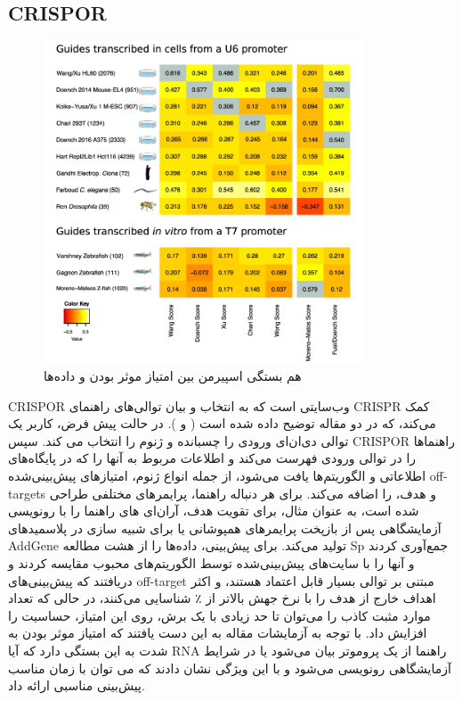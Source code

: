 \documentclass[12pt,a4paper,BCOR=.7cm,headsepline,bibliography=totoc]{report}
\begin{document}
\subsection{CRISPOR~\cite{CRISPOR}}
\begin{figure}
\centering
\includegraphics[width=9.5cm, ]{pictures/CRISPOR.jpg}
\caption{
هم بستگی اسپیرمن بین امتیاز موثر بودن و داده‌ها	\cite{CRISPOR}
}\label{wrap-fig:4}
\end{figure}
CRISPOR
 وب‌سایتی است که به انتخاب و بیان توالی‌های راهنمای CRISPR کمک می‌کند، که در دو مقاله توضیح داده شده است (  و  ). در حالت پیش فرض، کاربر یک توالی دی‌ان‌ای ورودی را چسبانده و ژنوم را انتخاب می کند. سپس CRISPOR راهنماها را در توالی ورودی فهرست می‌کند و اطلاعات مربوط به آنها را که در پایگاه‌های اطلاعاتی و الگوریتم‌ها یافت می‌شود، از جمله انواع ژنوم، امتیازهای پیش‌بینی‌شده off-targets و هدف، را اضافه می‌کند. برای هر دنباله راهنما، پرایمرهای مختلفی طراحی شده است، به عنوان مثال، برای تقویت هدف، آر‌ان‌ای های راهنما را با رونویسی آزمایشگاهی پس از بازپخت پرایمرهای همپوشانی یا برای شبیه سازی در پلاسمیدهای AddGene تولید می‌کند.
برای پیش‌بینی، داده‌ها را از هشت مطالعه  Sp جمع‌آوری کردند و آنها را با سایت‌های پیش‌بینی‌شده توسط الگوریتم‌های محبوب مقایسه کردند و دریافتند که پیش‌بینی‌های off-target مبتنی بر توالی بسیار قابل اعتماد هستند، و اکثر اهداف خارج از هدف را با نرخ جهش بالاتر از ٪ شناسایی می‌کنند، در حالی که تعداد موارد مثبت کاذب را می‌توان تا حد زیادی با یک برش، روی این امتیاز، حساسیت را افزایش داد. با توجه به آزمایشات مقاله به این دست یافتند که امتیاز موثر بودن به شدت به این بستگی دارد که آیا RNA راهنما از یک پروموتر  بیان می‌شود یا در شرایط آزمایشگاهی رونویسی می‌شود و با این ویژگی نشان دادند که می توان با زمان مناسب پیش‌بینی مناسبی ارائه داد.
\end{document}
